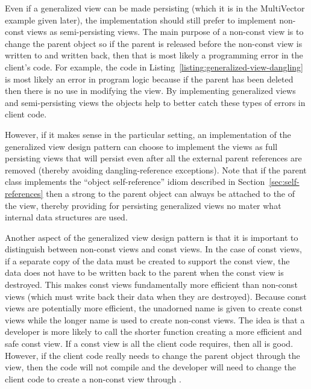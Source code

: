 \documentclass[pdf,ps2pdf,11pt]{SANDreport}
\begin{document}
Even if a generalized view can be made persisting (which it is in the
MultiVector example given later), the implementation should still
prefer to implement non-const views as semi-persisting views.  The
main purpose of a non-const view is to change the parent object so if
the parent is released before the non-const view is written to and
written back, then that is most likely a programming error in the
client's code.  For example, the code in
Listing~\ref{listing:generalized-view-dangling} is most likely an
error in program logic because if the parent has been deleted then
there is no use in modifying the view.  By implementing generalized
views and semi-persisting views the objects help to better catch these
types of errors in client code.

However, if it makes sense in the particular setting, an
implementation of the generalized view design pattern can choose to
implement the views as full persisting views that will persist even
after all the external parent references are removed (thereby avoiding
dangling-reference exceptions).  Note that if the parent class
implements the ``object self-reference'' idiom described in
Section~\ref{sec:self-references} then a strong {} to the
parent object can always be attached to the {} of the view,
thereby providing for persisting generalized views no mater what
internal data structures are used.

Another aspect of the generalized view design pattern is that it is
important to distinguish between non-const views and const views.  In
the case of const views, if a separate copy of the data must be
created to support the const view, the data does not have to be
written back to the parent when the const view is destroyed.  This
makes const views fundamentally more efficient than non-const views
(which must write back their data when they are destroyed).  Because
const views are potentially more efficient, the unadorned name
{} is given to create const views while the
longer name {} is used to create
non-const views.  The idea is that a developer is more likely to call
the shorter {} function creating a more efficient
and safe const view.  If a const view is all the client code requires,
then all is good.  However, if the client code really needs to change
the parent object through the view, then the code will not compile and
the developer will need to change the client code to create a
non-const view through {}.
\end{document}
